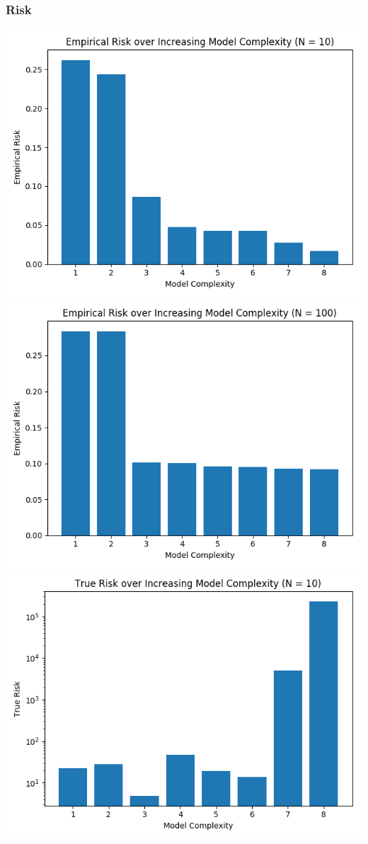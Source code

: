 \documentclass{article}
\begin{document}
\subsubsection{Risk}
\includegraphics[width=\linewidth]{empirical.png}
\includegraphics[width=\linewidth]{empirical_100.png}
\includegraphics[width=\linewidth]{true.png}
\end{document}
